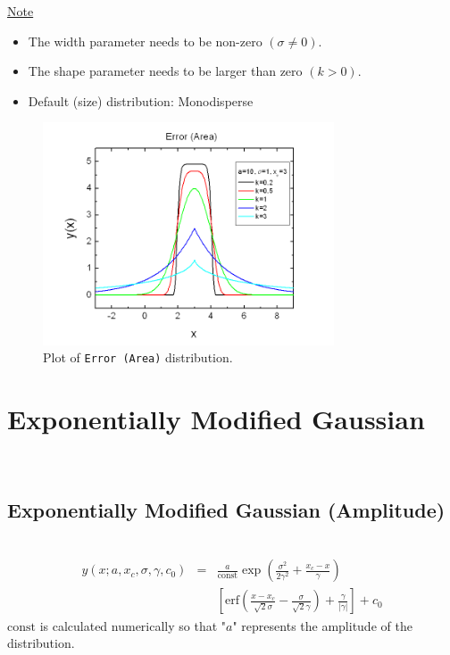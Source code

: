 \underline{Note}
\begin{itemize}
  \item The width parameter needs to be non-zero $(\sigma\neq 0)$.
  \item The shape parameter needs to be larger than zero $(k>0)$.
  \item Default (size) distribution: Monodisperse
\end{itemize}
\begin{figure}[htb]
\begin{center}
\includegraphics[width=0.768\textwidth]{ErrorArea.png}
\end{center}
\caption{Plot of \texttt{Error (Area)} distribution.}
\label{fig:ErrorArea}
\end{figure}

\clearpage
\section{Exponentially Modified Gaussian} ~\\
\label{sec:ExponentiallyModifiedGaussian}
\subsection{Exponentially Modified Gaussian (Amplitude)} \hspace{1pt} \\
\label{sec:ExponentiallyModifiedGaussianAmplitude}
\begin{eqnarray}
y(x;a,x_c,\sigma,\gamma,c_0) & = &
\frac{a}{\mathrm{const}}
\exp\left(\frac{\sigma^2}{2\gamma^2}+\frac{x_c-x}{\gamma}\right) \nonumber \\
& & \left[\mathrm{erf}\left(\frac{x-x_c}{\sqrt{2}\sigma}-\frac{\sigma}{\sqrt{2}\gamma}\right)+\frac{\gamma}{| \gamma |}\right]
+c_0
\end{eqnarray}
$\mbox{const}$ is calculated numerically so that "$a$" represents the amplitude of the distribution.
\vspace{5mm}


